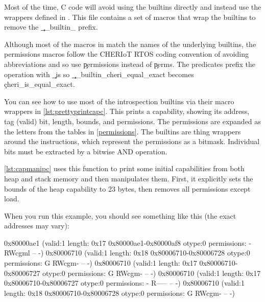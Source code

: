 {{{{{{{{Most of the time, C code will avoid using the builtins directly and instead use the wrappers defined in .
This file contains a set of macros that wrap the builtins to remove the \c{__builtin_} prefix.

\begin{note}
	Although most of the macros in  match the names of the underlying builtins, the permissions macros follow the CHERIoT RTOS coding convention of avoiding abbreviations and so use \c{permissions} instead of \c{perms}.
	The predicates prefix the operation with \c{_is} so \c{__builtin_cheri_equal_exact} becomes \c{cheri_is_equal_exact}.
\end{note}

You can see how to use most of the introspection builtins via their macro wrappers in \ref{lst:prettyprintcapc}.
This prints a capability, showing its address, tag (valid) bit, length, bounds, and permissions.
The permissions are expanded as the letters from the tables in \ref{permissions}.
The builtins are thing wrappers around the instructions, which represent the permissions as a bitmask.
Individual bits must be extracted by a bitwise AND operation.

\codelisting[filename=examples/manipulate_capabilities_c/example.c,marker=print_capability,label=lst:prettyprintcapc,caption="Pretty printing a capability using the C builtin wrappers."]{}

\ref{lst:capmanipc} uses this function to print some initial capabilities from both heap and stack memory and then manipulates them.
First, it explicitly sets the bounds of the heap capability to 23 bytes, then removes all permissions except load.

\codelisting[filename=examples/manipulate_capabilities_c/example.c,marker=capability_manipulation,label=lst:capmanipc,caption="Manipulating capabilities using the C builtin wrappers."]{}

When you run this example, you should see something like this (the exact addresses may vary):

\begin{console}
0x80000ae1 (valid:1 length: 0x17 0x80000ae1-0x80000af8 otype:0 permissions: - RWcgml -- -)
0x80006710 (valid:1 length: 0x18 0x80006710-0x80006728 otype:0 permissions: G RWcgm- -- -)
0x80006710 (valid:1 length: 0x17 0x80006710-0x80006727 otype:0 permissions: G RWcgm- -- -)
0x80006710 (valid:1 length: 0x17 0x80006710-0x80006727 otype:0 permissions: - R----- -- -)
0x80006710 (valid:1 length: 0x18 0x80006710-0x80006728 otype:0 permissions: G RWcgm- -- -)
\end{console}

}}}}}}}}
